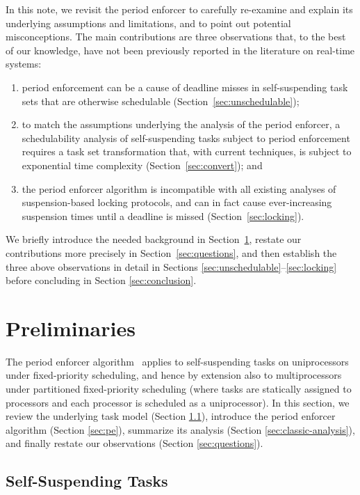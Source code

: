 In this note, we revisit the period enforcer \cite{Raj:suspension1991} to carefully re-examine and explain its underlying assumptions and limitations, and to point out potential misconceptions.  The main contributions are three observations that, to the best of our knowledge, have not been previously reported in the literature on real-time systems:
\begin{enumerate}
	\item period enforcement can be a cause of deadline misses in self-suspending task sets that are otherwise schedulable (Section~\ref{sec:unschedulable}); 
	\item to match the assumptions underlying the analysis of the period enforcer, a schedulability analysis of self-suspending tasks subject to period enforcement requires a task set  transformation that, with current techniques, is subject to exponential time complexity (Section~\ref{sec:convert}); and
	\item the period enforcer algorithm is incompatible with all existing analyses of suspension-based locking protocols, and can in fact cause ever-increasing suspension times until a deadline is missed (Section~\ref{sec:locking}).
\end{enumerate}


We briefly introduce the needed background in Section~\ref{sec:prelim}, restate our contributions more precisely in Section~\ref{sec:questions}, and then establish the three above  observations in detail in Sections \ref{sec:unschedulable}--\ref{sec:locking} before concluding in Section \ref{sec:conclusion}.

\section{Preliminaries}
\label{sec:prelim}

The period enforcer algorithm~\cite{Raj:suspension1991} applies to self-suspending tasks on uniprocessors under fixed-priority scheduling, and hence by extension also to multiprocessors under partitioned fixed-priority scheduling (where tasks are statically assigned to processors and each processor is scheduled as a uniprocessor). In this section, we review the underlying task model (Section \ref{sec:taskmodel}), introduce the period enforcer algorithm (Section \ref{sec:pe}), summarize its analysis (Section \ref{sec:classic-analysis}), and finally restate our observations (Section \ref{sec:questions}).

\subsection{Self-Suspending Tasks}
\label{sec:taskmodel}

